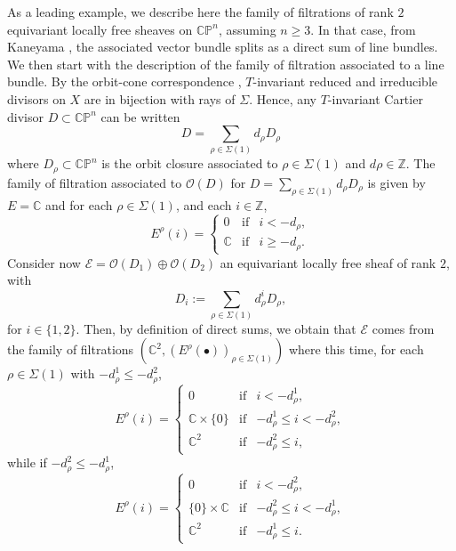 \documentclass[a4paper,10pt]{amsart}
\theoremstyle{plain}{
    \newtheorem{theorem}{Theorem}[section]
    \newtheorem{lemma}[theorem]{Lemma}
    \newtheorem{corollary}[theorem]{Corollary}
    \newtheorem{proposition}[theorem]{Proposition}
    \newtheorem{conjecture}[theorem]{Conjecture}
}
\theoremstyle{definition}{
    \newtheorem{definition}[theorem]{Definition}
    \newtheorem{defn-thm}[theorem]{Definition-Theorem}
    \newtheorem{example}[theorem]{Example}
    \newtheorem{notation}[theorem]{Notation}
}
\theoremstyle{remark}{
    \newtheorem{remark}[theorem]{Remark}
    \newtheorem{problem}[theorem]{Problem}
    \newtheorem{question}[theorem]{Question}
}
\def\cE{\mathcal{E}}
\def\cO{\mathcal{O}}
\def\Z{\mathbb{Z}}
\def\P{\mathbb{P}}
\def\C{\mathbb{C}}
\begin{document}
\begin{example}
\label{ex:rank two case}
As a leading example, we describe here the family of filtrations of rank $2$ equivariant locally free sheaves on $\C\P^n$, assuming $n\geq 3$. In that case, from Kaneyama \cite[Corollary 3.5]{Kan}, the associated vector bundle splits as a direct sum of line bundles. We then start with the description of the family of filtration associated to a line bundle. By the orbit-cone correspondence \cite[Chapter 3]{CLS}, $T$-invariant  reduced and irreducible divisors on $X$ are in bijection with rays of $\Sigma$. Hence, any $T$-invariant Cartier divisor $D\subset \C\P^n$ can be written
 $$
 D=\sum_{\rho\in\Sigma(1)} d_\rho D_\rho
 $$
 where $D_\rho\subset \C\P^n$ is the orbit closure associated to $\rho\in\Sigma(1)$ and $d\rho\in\Z$.   The family of filtration associated to $\cO(D)$ for $D=\sum_{\rho\in\Sigma(1)} d_\rho D_\rho$ is given by $E=\C$ and for each $\rho\in\Sigma(1)$, and each $i\in \Z$,
  \begin{equation*}
E^\rho(i)=
\left\{ 
\begin{array}{ccc}
0 & \mathrm{ if } & i < -d_\rho,\\
\C & \mathrm{ if } & i \geq -d_\rho.
\end{array}
\right.
\end{equation*}
Consider now $\cE=\cO(D_1)\oplus\cO(D_2)$ an equivariant locally free sheaf of rank $2$, with 
$$
D_i:=\sum_{\rho\in\Sigma(1)} d^i_\rho D_\rho,
$$
for $i\in\lbrace 1,2\rbrace$. Then, by definition of direct sums, we obtain that $\cE$ comes from the family of filtrations $(\C^2,(E^\rho(\bullet))_{\rho\in\Sigma(1)})$ where this time, for each $\rho\in\Sigma(1)$ with $-d^1_\rho\leq -d^2_\rho$,
\begin{equation*}
E^\rho(i)=\left\{ 
\begin{array}{ccc}
0 & \mathrm{ if } & i < -d^1_\rho,\\
\C\times\lbrace 0\rbrace & \mathrm{ if } & -d^1_\rho\leq i < -d^2_\rho,\\
\C^2 & \mathrm{ if } &  -d_\rho^2\leq i,
\end{array}
\right.
\end{equation*}
while if $-d^2_\rho\leq -d^1_\rho$, 
\begin{equation*}
E^\rho(i)=\left\{ 
\begin{array}{ccc}
0 & \mathrm{ if } & i < -d^2_\rho,\\
\lbrace 0\rbrace \times\C & \mathrm{ if } & -d^2_\rho\leq i < -d^1_\rho,\\
\C^2 & \mathrm{ if } &  -d_\rho^1\leq i.
\end{array}
\right.
\end{equation*}
\end{example}
\end{document}

